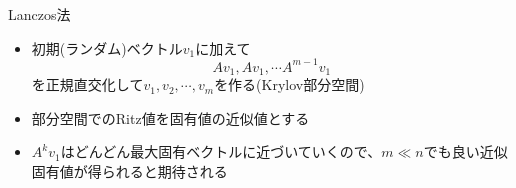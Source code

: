 \begin{frame}[t,fragile]{Lanczos法}
  \begin{itemize}
  \item 初期(ランダム)ベクトル$v_1$に加えて
    \[
    Av_1, Av_1, \cdots A^{m-1}v_1
    \]
    を正規直交化して$v_1,v_2,\cdots,v_m$を作る(Krylov部分空間)
  \item 部分空間でのRitz値を固有値の近似値とする
  \item $A^kv_1$はどんどん最大固有ベクトルに近づいていくので、$m \ll n$でも良い近似固有値が得られると期待される
  \end{itemize}
\end{frame}
